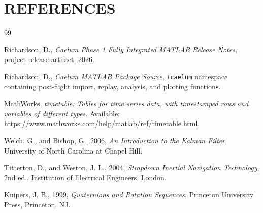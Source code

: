 \documentclass[colorlinks,upint,subscriptcorrection,varvw,hyphenate,balance]{asmeconf}
\newcommand{\code}[1]{\texttt{\allowbreak#1}}
\begin{document}
\section*{REFERENCES}
\begin{thebibliography}{99}

Richardson, D., \emph{Caelum Phase 1 Fully Integrated MATLAB Release Notes}, project release artifact, 2026.

Richardson, D., \emph{Caelum MATLAB Package Source}, \code{+caelum} namespace containing post-flight import, replay, analysis, and plotting functions.

MathWorks, \emph{timetable: Tables for time series data, with timestamped rows and variables of different types}. Available: \url{https://www.mathworks.com/help/matlab/ref/timetable.html}.

Welch, G., and Bishop, G., 2006, \emph{An Introduction to the Kalman Filter}, University of North Carolina at Chapel Hill.

Titterton, D., and Weston, J. L., 2004, \emph{Strapdown Inertial Navigation Technology}, 2nd ed., Institution of Electrical Engineers, London.

Kuipers, J. B., 1999, \emph{Quaternions and Rotation Sequences}, Princeton University Press, Princeton, NJ.

\end{thebibliography}
\end{document}
